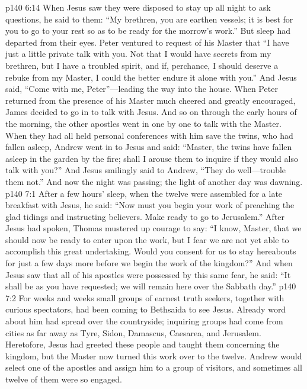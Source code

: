 \vs p140 6:14 When Jesus saw they were disposed to stay up all night to ask questions, he said to them: \textcolor{ubdarkred}{“My brethren, you are earthen vessels; it is best for you to go to your rest so as to be ready for the morrow’s work.”} But sleep had departed from their eyes. Peter ventured to request of his Master that “I have just a little private talk with you. Not that I would have secrets from my brethren, but I have a troubled spirit, and if, perchance, I should deserve a rebuke from my Master, I could the better endure it alone with you.” And Jesus said, \textcolor{ubdarkred}{“Come with me, Peter”}---leading the way into the house. When Peter returned from the presence of his Master much cheered and greatly encouraged, James decided to go in to talk with Jesus. And so on through the early hours of the morning, the other apostles went in one by one to talk with the Master. When they had all held personal conferences with him save the twins, who had fallen asleep, Andrew went in to Jesus and said: “Master, the twins have fallen asleep in the garden by the fire; shall I arouse them to inquire if they would also talk with you?” And Jesus smilingly said to Andrew, \textcolor{ubdarkred}{“They do well---trouble them not.”} And now the night was passing; the light of another day was dawning.
\vs p140 7:1 After a few hours’ sleep, when the twelve were assembled for a late breakfast with Jesus, he said: \textcolor{ubdarkred}{“Now must you begin your work of preaching the glad tidings and instructing believers. Make ready to go to Jerusalem.”} After Jesus had spoken, Thomas mustered up courage to say: “I know, Master, that we should now be ready to enter upon the work, but I fear we are not yet able to accomplish this great undertaking. Would you consent for us to stay hereabouts for just a few days more before we begin the work of the kingdom?” And when Jesus saw that all of his apostles were possessed by this same fear, he said: \textcolor{ubdarkred}{“It shall be as you have requested; we will remain here over the Sabbath day.”}
\pc \vs p140 7:2 For weeks and weeks small groups of earnest truth seekers, together with curious spectators, had been coming to Bethsaida to see Jesus. Already word about him had spread over the countryside; inquiring groups had come from cities as far away as Tyre, Sidon, Damascus, Caesarea, and Jerusalem. Heretofore, Jesus had greeted these people and taught them concerning the kingdom, but the Master now turned this work over to the twelve. Andrew would select one of the apostles and assign him to a group of visitors, and sometimes all twelve of them were so engaged.
